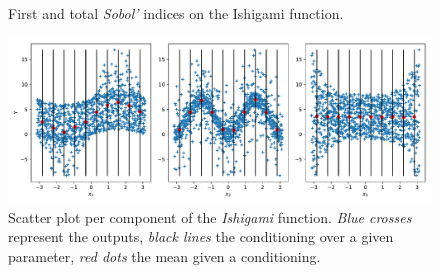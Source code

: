 \begin{figure}[!h]               
\centering
{}
~
\caption{First and total \textit{Sobol'} indices on the Ishigami function.}
\label{fig:sobol}
\end{figure}


\begin{figure}[!h]
\centering
\includegraphics[width=\linewidth,keepaspectratio]{fig/literature/scatter_sobol.pdf}
\caption{Scatter plot per component of the \textit{Ishigami} function. \emph{Blue crosses} represent the outputs, \emph{black lines} the conditioning over a given parameter, \emph{red dots} the mean given a conditioning.}
\label{fig:scatter_sobol}
\end{figure}

